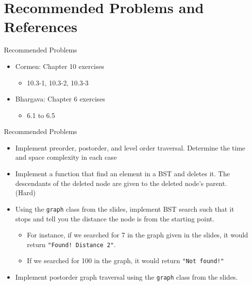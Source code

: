 \documentclass[
  ignorenonframetext,
]{beamer}
\providecommand{\tightlist}{%
  \setlength{\itemsep}{0pt}\setlength{\parskip}{0pt}}\usepackage{longtable,booktabs,array}
\begin{document}
\hypertarget{recommended-problems-and-references}{%
\section{Recommended Problems and
References}\label{recommended-problems-and-references}}

\begin{frame}{Recommended Problems}
\protect\hypertarget{recommended-problems}{}
\begin{itemize}
\item
  Cormen: Chapter 10 exercises

  \begin{itemize}
  \tightlist
  \item
    10.3-1, 10.3-2, 10.3-3
  \end{itemize}
\item
  Bhargava: Chapter 6 exercises

  \begin{itemize}
  \tightlist
  \item
    6.1 to 6.5
  \end{itemize}
\end{itemize}
\end{frame}

\begin{frame}[fragile]{Recommended Problems}
\protect\hypertarget{recommended-problems-1}{}
\begin{itemize}
\item
  Implement preorder, postorder, and level order traversal. Determine
  the time and space complexity in each case
\item
  Implement a function that find an element in a BST and deletes it. The
  descendants of the deleted node are given to the deleted node's
  parent. (Hard)
\item
  Using the \texttt{graph} class from the slides, implement BST search
  such that it stops and tell you the distance the node is from the
  starting point.

  \begin{itemize}
  \item
    For instance, if we searched for 7 in the graph given in the slides,
    it would return \texttt{"Found!\ Distance\ 2"}.
  \item
    If we searched for 100 in the graph, it would return
    \texttt{"Not\ found!"}
  \end{itemize}
\item
  Implement postorder graph traversal using the \texttt{graph} class
  from the slides.
\end{itemize}
\end{frame}
\end{document}
